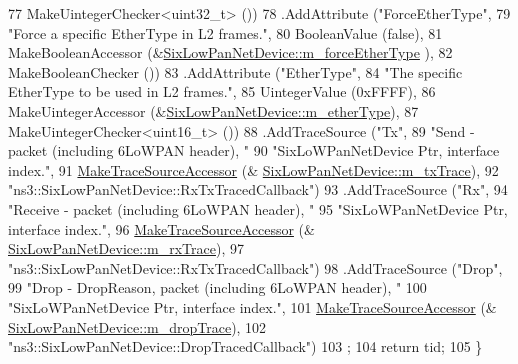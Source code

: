 \begin{DoxyCode}
77                    MakeUintegerChecker<uint32\_t> ())
78     .AddAttribute (\textcolor{stringliteral}{"ForceEtherType"},
79                    \textcolor{stringliteral}{"Force a specific EtherType in L2 frames."},
80                    BooleanValue (\textcolor{keyword}{false}),
81                    MakeBooleanAccessor (&\hyperlink{classns3_1_1SixLowPanNetDevice_a57d9f56656023ad738e092ba9f668192}{SixLowPanNetDevice::m\_forceEtherType}
      ),
82                    MakeBooleanChecker ())
83     .AddAttribute (\textcolor{stringliteral}{"EtherType"},
84                    \textcolor{stringliteral}{"The specific EtherType to be used in L2 frames."},
85                    UintegerValue (0xFFFF),
86                    MakeUintegerAccessor (&\hyperlink{classns3_1_1SixLowPanNetDevice_afdea8e77d8ec66aef94e8cdbb645004b}{SixLowPanNetDevice::m\_etherType}),
87                    MakeUintegerChecker<uint16\_t> ())
88     .AddTraceSource (\textcolor{stringliteral}{"Tx"},
89                      \textcolor{stringliteral}{"Send - packet (including 6LoWPAN header), "}
90                      \textcolor{stringliteral}{"SixLoWPanNetDevice Ptr, interface index."},
91                      \hyperlink{group__tracing_gab21a770b9855af4e8f69f7531ea4a6b0}{MakeTraceSourceAccessor} (&
      \hyperlink{classns3_1_1SixLowPanNetDevice_a6d80896d0b58fd8a5577c65a060ad3b1}{SixLowPanNetDevice::m\_txTrace}),
92                      \textcolor{stringliteral}{"ns3::SixLowPanNetDevice::RxTxTracedCallback"})
93     .AddTraceSource (\textcolor{stringliteral}{"Rx"},
94                      \textcolor{stringliteral}{"Receive - packet (including 6LoWPAN header), "}
95                      \textcolor{stringliteral}{"SixLoWPanNetDevice Ptr, interface index."},
96                      \hyperlink{group__tracing_gab21a770b9855af4e8f69f7531ea4a6b0}{MakeTraceSourceAccessor} (&
      \hyperlink{classns3_1_1SixLowPanNetDevice_a868eb6580b5eced376dadafa67aeda6b}{SixLowPanNetDevice::m\_rxTrace}),
97                      \textcolor{stringliteral}{"ns3::SixLowPanNetDevice::RxTxTracedCallback"})
98     .AddTraceSource (\textcolor{stringliteral}{"Drop"},
99                      \textcolor{stringliteral}{"Drop - DropReason, packet (including 6LoWPAN header), "}
100                      \textcolor{stringliteral}{"SixLoWPanNetDevice Ptr, interface index."},
101                      \hyperlink{group__tracing_gab21a770b9855af4e8f69f7531ea4a6b0}{MakeTraceSourceAccessor} (&
      \hyperlink{classns3_1_1SixLowPanNetDevice_a93e0ef7a17057bcb8420b8d37ec56356}{SixLowPanNetDevice::m\_dropTrace}),
102                      \textcolor{stringliteral}{"ns3::SixLowPanNetDevice::DropTracedCallback"})
103   ;
104   \textcolor{keywordflow}{return} tid;
105 \}
\end{DoxyCode}


